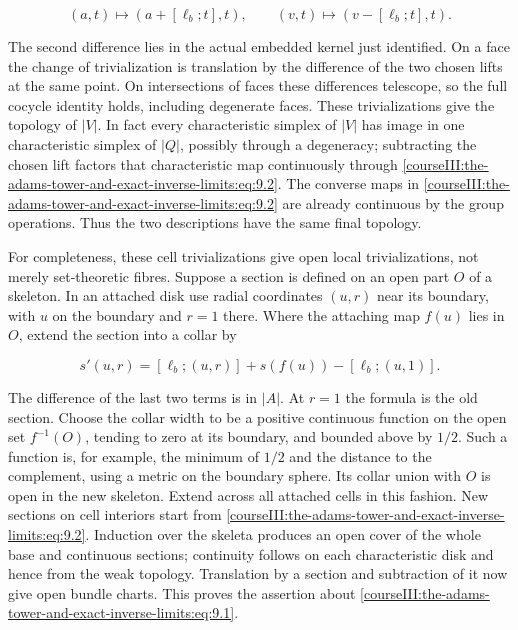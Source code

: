 \begin{equation}
(a,t)\longmapsto(a+[\ell_b;t],t),\qquad
 (v,t)\longmapsto(v-[\ell_b;t],t).
 \label{courseIII:the-adams-tower-and-exact-inverse-limits:eq:9.2}
\end{equation}

The second difference lies in the actual embedded kernel just identified. On a face the change of trivialization is translation by the difference of the two chosen lifts at the same point. On intersections of faces these differences telescope, so the full cocycle identity holds, including degenerate faces. These trivializations give the topology of \(|V|\). In fact every characteristic simplex of \(|V|\) has image in one characteristic simplex of \(|Q|\), possibly through a degeneracy; subtracting the chosen lift factors that characteristic map continuously through \eqref{courseIII:the-adams-tower-and-exact-inverse-limits:eq:9.2}. The converse maps in \eqref{courseIII:the-adams-tower-and-exact-inverse-limits:eq:9.2} are already continuous by the group operations. Thus the two descriptions have the same final topology.

For completeness, these cell trivializations give open local trivializations, not merely set-theoretic fibres. Suppose a section is defined on an open part \(O\) of a skeleton. In an attached disk use radial coordinates \((u,r)\) near its boundary, with \(u\) on the boundary and \(r=1\) there. Where the attaching map \(f(u)\) lies in \(O\), extend the section into a collar by

\begin{equation}
s'(u,r)=[\ell_b;(u,r)]
          +s(f(u))-[\ell_b;(u,1)].
 \label{courseIII:the-adams-tower-and-exact-inverse-limits:eq:9.3}
\end{equation}

The difference of the last two terms is in \(|A|\). At \(r=1\) the formula is the old section. Choose the collar width to be a positive continuous function on the open set \(f^{-1}(O)\), tending to zero at its boundary, and bounded above by \(1/2\). Such a function is, for example, the minimum of \(1/2\) and the distance to the complement, using a metric on the boundary sphere. Its collar union with \(O\) is open in the new skeleton. Extend across all attached cells in this fashion. New sections on cell interiors start from \eqref{courseIII:the-adams-tower-and-exact-inverse-limits:eq:9.2}. Induction over the skeleta produces an open cover of the whole base and continuous sections; continuity follows on each characteristic disk and hence from the weak topology. Translation by a section and subtraction of it now give open bundle charts. This proves the assertion about \eqref{courseIII:the-adams-tower-and-exact-inverse-limits:eq:9.1}.

